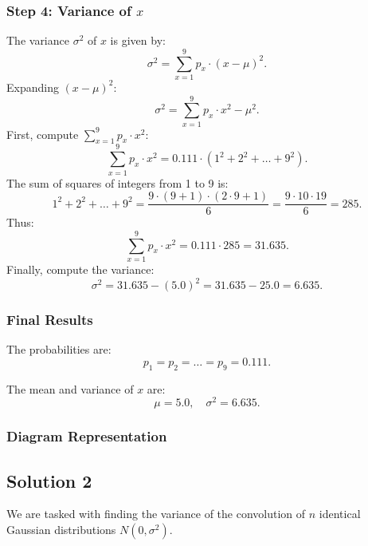 \documentclass[12pt]{article}
\begin{document}
\subsubsection*{Step 4: Variance of \( x \)}
The variance \( \sigma^2 \) of \( x \) is given by:
\[
\sigma^2 = \sum_{x=1}^9 p_x \cdot (x - \mu)^2.
\]
Expanding \( (x - \mu)^2 \):
\[
\sigma^2 = \sum_{x=1}^9 p_x \cdot x^2 - \mu^2.
\]
First, compute \( \sum_{x=1}^9 p_x \cdot x^2 \):
\[
\sum_{x=1}^9 p_x \cdot x^2 = 0.111 \cdot (1^2 + 2^2 + \dots + 9^2).
\]
The sum of squares of integers from 1 to 9 is:
\[
1^2 + 2^2 + \dots + 9^2 = \frac{9 \cdot (9 + 1) \cdot (2 \cdot 9 + 1)}{6} = \frac{9 \cdot 10 \cdot 19}{6} = 285.
\]
Thus:
\[
\sum_{x=1}^9 p_x \cdot x^2 = 0.111 \cdot 285 = 31.635.
\]
Finally, compute the variance:
\[
\sigma^2 = 31.635 - (5.0)^2 = 31.635 - 25.0 = 6.635.
\]

\subsubsection*{Final Results}
The probabilities are:
\[
p_1 = p_2 = \dots = p_9 = 0.111.
\]

The mean and variance of \( x \) are:
\[
\mu = 5.0, \quad \sigma^2 = 6.635.
\]

\subsubsection*{Diagram Representation}
\begin{center}
\end{center}

\subsection*{Solution 2}

We are tasked with finding the variance of the convolution of \( n \) identical Gaussian distributions \( N(0, \sigma^2) \). 
\end{document}

